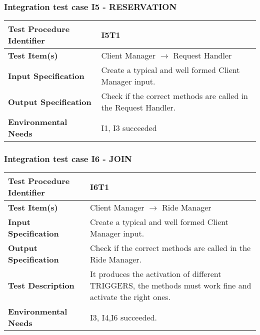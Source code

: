 \subsubsection{Integration test case I5 - RESERVATION }
 \begin{tabular}{l p{}}
    \hline
    \textbf{Test Procedure Identifier} & I5T1\\
    \hline
    \textbf{Test Item(s)} & Client Manager  $\rightarrow$ Request Handler \\
    \hline
    \textbf{Input Specification} &  Create a typical and well formed Client Manager input.  \\
    \hline
    \textbf{Output Specification} & Check if the correct methods are called in the Request Handler.  \\
    \textbf{Environmental Needs} &  I1, I3 succeeded\\
    \hline
    \end{tabular}
\hfill \newline \newline  
\subsubsection{Integration test case I6 - JOIN } 
\begin{tabular}{l p{}}
    \hline
    \textbf{Test Procedure Identifier} & I6T1 \\
    \hline
    \textbf{Test Item(s)} & Client Manager $\rightarrow$ Ride Manager \\
    \hline
    \textbf{Input Specification} &  Create a typical and well formed Client Manager input.   \\
    \hline
    \textbf{Output Specification} & Check if the correct methods are called in the Ride Manager.\\
    \hline
    \textbf{Test Description} & It produces the activation of different TRIGGERS, the methods must work fine and activate the right ones.\\
    \hline
    \textbf{Environmental Needs} &  I3, I4,I6 succeeded.\\
    \hline
\end{tabular}
\hfill \newline \newline 
